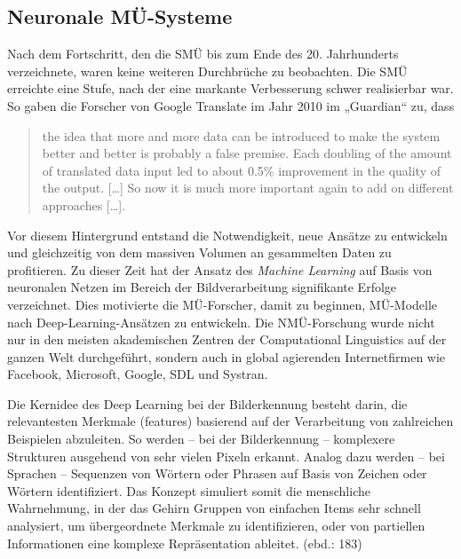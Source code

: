 \subsection{Neuronale MÜ-Systeme}
\label{sec:3.2.4}
Nach dem Fortschritt, den die SMÜ bis zum Ende des 20. Jahrhunderts verzeichnete, waren keine weiteren Durchbrüche zu beobachten. Die SMÜ erreichte eine Stufe, nach der eine markante Verbesserung schwer realisierbar war. So gaben die Forscher von Google Translate im Jahr 2010 im „Guardian“ zu, dass

\begin{quote}
the idea that more and more data can be introduced to make the system better and better is probably a false premise. Each doubling of the amount of translated data input led to about 0.5\% improvement in the quality of the output. [\ldots] So now it is much more important again to add on different approaches [\ldots]. \citep[4]{Adams2010}
\end{quote}

Vor diesem Hintergrund entstand die Notwendigkeit, neue Ansätze zu entwickeln und gleichzeitig von dem massiven Volumen an gesammelten Daten zu profitieren. Zu dieser Zeit hat der Ansatz des \textit{Machine Learning} auf Basis von neuronalen Netzen im Bereich der Bildverarbeitung signifikante Erfolge verzeichnet. Dies motivierte die MÜ-Forscher, damit zu beginnen, MÜ-Modelle nach Deep-Learning-Ansätzen zu entwickeln. Die NMÜ-Forschung wurde nicht nur in den meisten akademischen Zentren der Computational Linguistics auf der ganzen Welt durchgeführt, sondern auch in global agierenden Internetfirmen wie Facebook, Microsoft, Google, SDL und Systran. \citep[45]{Poibeau2017}

Die Kernidee des Deep Learning bei der Bilderkennung besteht darin, die relevantesten Merkmale (features) basierend auf der Verarbeitung von zahlreichen Beispielen abzuleiten. So werden -- bei der Bilderkennung -- komplexere Strukturen ausgehend von sehr vielen Pixeln erkannt. Analog dazu werden -- bei Sprachen -- Sequenzen von Wörtern oder Phrasen auf Basis von Zeichen oder Wörtern identifiziert. Das Konzept simuliert somit die menschliche Wahrnehmung, in der das Gehirn Gruppen von einfachen Items sehr schnell analysiert, um übergeordnete Merkmale zu identifizieren, oder von partiellen Informationen eine komplexe Repräsentation ableitet. (ebd.: 183)

